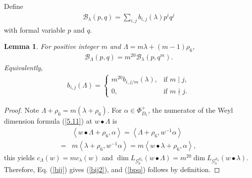 \documentclass[12pt]{article}
\numberwithin{equation}{section}
\newtheorem{lemma}[theorem]{Lemma}
\theoremstyle{definition}
\theoremstyle{remark}
\begin{document}
Define 
\begin{eqnarray}
	\mathcal{B}_{\lambda}(p,q)=\sum_{i,j}b_{i,j}(\lambda)p^iq^j
\end{eqnarray}
with formal variable $p$ and $q$.
\begin{lemma}\label{Lem5.4}
	For positive integer $m$ and $\Lambda=m\lambda+(m-1)\rho_6$,
	\begin{eqnarray}
		\mathcal{B}_{\Lambda}(p,q)=m^{20}\mathcal{B}_{\lambda}(p,q^m).\label{bpq}
	\end{eqnarray}
	Equivalently, 
	\begin{align}
		b_{i,j}(\Lambda)=\begin{cases}
			m^{20}b_{i,j/m}(\lambda),&\text{if }m\mid j,\\
			0,&\text{if }m\nmid j.
		\end{cases}\label{bij2}
	\end{align}
\end{lemma}
\begin{proof}
	Note $\Lambda+\rho_6=m(\lambda+\rho_6)$.
	For $\alpha\in\Phi^{+}_{D_5}$, the numerator of the Weyl dimension formula (\ref{5.11}) at $w\bullet\Lambda$ is
	\begin{align}
		&\left\langle w\bullet\Lambda+\rho_6,\alpha\right\rangle =\left\langle \Lambda+\rho_6,w^{-1}\alpha \right\rangle\nonumber\\
		=&m\left\langle \lambda+\rho_6,w^{-1}\alpha \right\rangle=m\left\langle w\bullet\lambda+\rho_6,\alpha\right\rangle,
 	\end{align}
	this yields $c_{\Lambda}(w)=mc_\lambda(w)$ and $\dim L_{\mathscr{G}_0^{E_6}}(w\bullet\Lambda)=m^{20}\dim L_{\mathscr{G}_0^{E_6}}(w\bullet\lambda)$.
	Therefore, Eq. (\ref{bij}) gives (\ref{bij2}), and (\ref{bpq}) follows by definition.
\end{proof}
\end{document}
